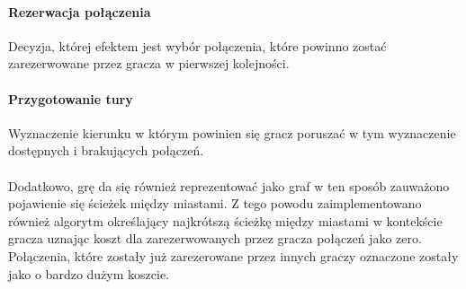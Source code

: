 \documentclass[12pt, oneside]{report}
\begin{document}
\paragraph{Rezerwacja połączenia} Decyzja, której efektem jest wybór połączenia, które powinno zostać zarezerwowane przez gracza w pierwszej kolejności.
\paragraph{Przygotowanie tury} Wyznaczenie kierunku w którym powinien się gracz poruszać w tym wyznaczenie dostępnych i brakujących połączeń.
\\ \\
Dodatkowo, grę da się również reprezentować jako graf w ten sposób zauważono pojawienie się ścieżek między miastami. Z tego powodu zaimplementowano również algorytm określający najkrótszą ścieżkę między miastami w kontekście gracza uznając koszt dla zarezerwowanych przez gracza połączeń jako zero. Połączenia, które zostały już zarezerowane przez innych graczy oznaczone zostały jako o bardzo dużym koszcie.
\end{document}
